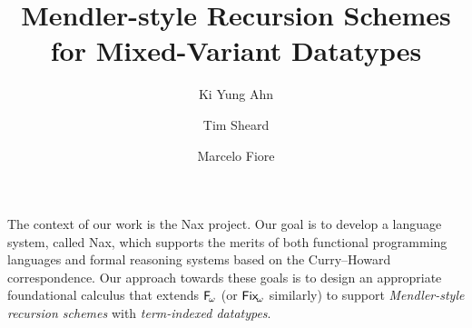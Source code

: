 \documentclass[a4paper]{easychair} %
\title{Mendler-style Recursion Schemes for Mixed-Variant Datatypes}
\author{
Ki Yung Ahn\inst{1}
\and
Tim Sheard\inst{1}
 \and
Marcelo Fiore\inst{2}
}
\institute{
  Portland State University~\thanks{supported by NSF grant 0910500.}
\and
  University of Cambridge
}
\newcommand{\Fw}[0]{{\ensuremath{\mathsf{\uppercase{F}}_{\!\omega}}}}
\newcommand{\Fixw}[0]{{\ensuremath{\mathsf{\uppercase{F}\lowercase{ix}}_{\!\omega}}}}
\begin{document}
\maketitle


The context of our work is the Nax project.
Our goal is to develop a language system, called Nax, which supports the merits of both
functional programming languages and formal reasoning systems based on
the Curry--Howard correspondence. Our approach towards these goals is to 
design an appropriate foundational calculus \cite{AhnSheFioPit13}
that extends \Fw \cite{Girard72} (or \Fixw \cite{AbeMat04} similarly) to support
\emph{Mendler-style recursion schemes} \cite{Mendler87} with \emph{term-indexed datatypes}.
\end{document}
